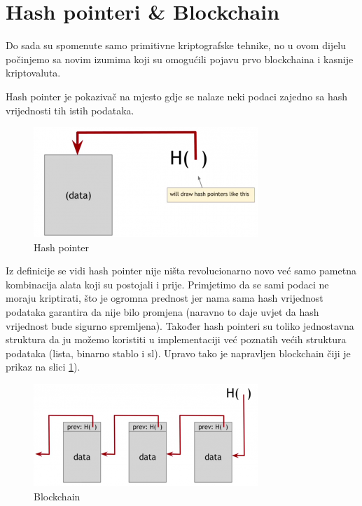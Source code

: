 \documentclass[12pt]{report}
\begin{document}
\section{Hash pointeri \& Blockchain}

Do sada su spomenute samo primitivne kriptografske tehnike, no u ovom dijelu počinjemo sa novim izumima koji su omogućili pojavu prvo blockchaina i kasnije kriptovaluta. 

\begin{definicija}
Hash pointer je pokazivač na mjesto gdje se nalaze neki podaci zajedno sa hash vrijednosti tih istih podataka.
\end{definicija}

\begin{figure}[h]
\centering
\includegraphics[scale=0.6]{hash_pointer}
\caption{Hash pointer}
\end{figure}

Iz definicije se vidi hash pointer nije ništa revolucionarno novo već samo pametna kombinacija alata koji su postojali i prije. Primjetimo da se sami podaci ne moraju kriptirati, što je ogromna prednost jer nama sama hash vrijednost podataka garantira da nije bilo promjena (naravno to daje uvjet da hash vrijednost bude sigurno spremljena). Također hash pointeri su toliko jednostavna struktura da ju možemo koristiti u implementaciji već poznatih većih struktura podataka (lista, binarno stablo i sl). Upravo tako je napravljen blockchain čiji je prikaz na slici \ref{fig:blockchain}).

\begin{figure}[!]
\centering
\includegraphics[scale=0.8]{blockchain}
\caption{Blockchain}
\label{fig:blockchain}
\end{figure}
\end{document}
